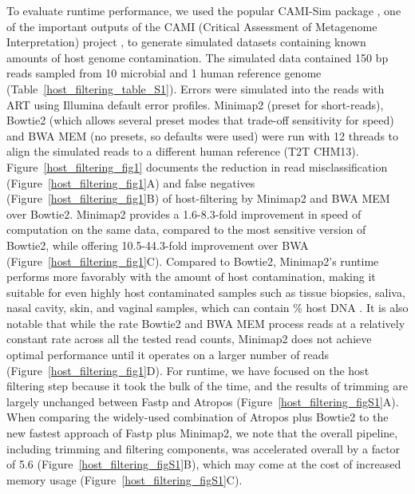 To evaluate runtime performance, we used the popular CAMI-Sim package \cite{Fritz2019-vg}, one of the important outputs of the CAMI (Critical Assessment of Metagenome Interpretation) project \cite{Sczyrba2017-wx}, to generate simulated datasets containing known amounts of host genome contamination. The simulated data contained 150 bp reads sampled from 10 microbial and 1 human reference genome (Table~\ref{host_filtering_table_S1}). Errors were simulated into the reads with ART \cite{Huang2012-nl} using Illumina default error profiles. Minimap2 (preset for short-reads), Bowtie2 (which allows several preset modes that trade-off sensitivity for speed) and BWA MEM \cite{Li2013-xz} (no presets, so defaults were used) were run with 12 threads to align the simulated reads to a different human reference (T2T CHM13).  Figure~\ref{host_filtering_fig1} documents the reduction in read misclassification (Figure~\ref{host_filtering_fig1}A) and false negatives (Figure~\ref{host_filtering_fig1}B) of host-filtering by Minimap2 and BWA MEM over Bowtie2. Minimap2 provides a 1.6-8.3-fold improvement in speed of computation on the same data, compared to the most sensitive version of Bowtie2, while offering 10.5-44.3-fold improvement over BWA (Figure~\ref{host_filtering_fig1}C). Compared to Bowtie2, Minimap2’s runtime performs more favorably with the amount of host contamination, making it suitable for even highly host contaminated samples such as tissue biopsies, saliva, nasal cavity, skin, and vaginal samples, which can contain \% host DNA \cite{Poore2020-yh,Marotz2018-yq}. It is also notable that while the rate Bowtie2 and BWA MEM process reads at a relatively constant rate across all the tested read counts, Minimap2 does not achieve optimal performance until it operates on a larger number of reads (Figure~\ref{host_filtering_fig1}D). For runtime, we have focused on the host filtering step because it took the bulk of the time, and the results of trimming are largely unchanged between Fastp and Atropos (Figure~\ref{host_filtering_figS1}A).   When comparing the widely-used combination of Atropos plus Bowtie2 to the new fastest approach of Fastp plus Minimap2, we note that the overall pipeline, including trimming and filtering components, was accelerated overall by a factor of 5.6 (Figure~\ref{host_filtering_figS1}B), which may come at the cost of increased memory usage (Figure~\ref{host_filtering_figS1}C).

